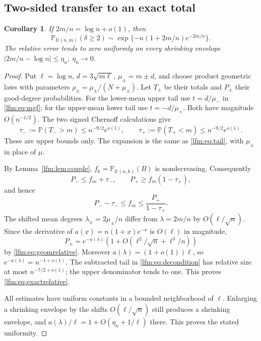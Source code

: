 \documentclass[11pt,letterpaper]{article}
\newtheorem{corollary}[theorem]{Corollary}
\theoremstyle{remark}\newtheorem{remark}[theorem]{Remark}
\newcommand{\Prob}{\mathbb P}\newcommand{\E}{\mathbb E}
\newcommand{\U}{\mathcal U}\newcommand{\dd}{\,\mathrm d}
\begin{document}
\subsection{Two-sided transfer to an exact total}
\begin{corollary}\label{lfm:cor:exactrelative}
If $2m/n=\log n+o(1)$, then
\begin{equation}
 \Prob_{\U(n,m)}(\delta\ge2)
 \sim\exp\{-n(1+2m/n)e^{-2m/n}\}.\label{lfm:eq:exactrelative}
\end{equation}
The relative error tends to zero uniformly on every shrinking envelope $|2m/n-\log n|\le\eta_n$, $\eta_n\to0$.
\end{corollary}
\begin{proof}
Put $\ell=\log n$, $d=3\sqrt{m\ell}$, $\mu_\pm=m\pm d$, and choose product geometric laws with parameters $\rho_\pm=\mu_\pm/(N+\mu_\pm)$. Let $T_\pm$ be their totals and $P_\pm$ their good-degree probabilities. For the lower-mean upper tail use $t=d/\mu_-$ in \eqref{lfm:eq:mgf}; for the upper-mean lower tail use $t=-d/\mu_+$. Both have magnitude $O(n^{-1/2})$. The two signed Chernoff calculations give
\begin{equation}
 \tau_-:=\Prob(T_->m)\le n^{-9/2}e^{o(1)},\qquad
 \tau_+:=\Prob(T_+<m)\le n^{-9/2}e^{o(1)}.\label{lfm:eq:both-tails}
\end{equation}
These are upper bounds only. The expansion is the same as \eqref{lfm:eq:tail}, with $\mu_\pm$ in place of $\mu$.

By Lemma~\ref{lfm:lem:couple}, $f_k=\Prob_{\U(n,k)}(B)$ is nondecreasing. Consequently
\[
 P_-\le f_m+\tau_-,\qquad
 P_+\ge f_m(1-\tau_+),
\]
and hence
\begin{equation}
 P_--\tau_-\le f_m\le\frac{P_+}{1-\tau_+}.\label{lfm:eq:decondition}
\end{equation}
The shifted mean degrees $\lambda_\pm=2\mu_\pm/n$ differ from $\lambda=2m/n$ by $O(\ell/\sqrt n)$. Since the derivative of $a(x)=n(1+x)e^{-x}$ is $O(\ell)$ in magnitude,
\[
 P_\pm=e^{-a(\lambda)}
 \left(1+O(\ell^2/\sqrt n+\ell^3/n)\right)
\]
by \eqref{lfm:eq:geomrelative}. Moreover $a(\lambda)=(1+o(1))\ell$, so $e^{-a(\lambda)}=n^{-1+o(1)}$. The subtracted tail in \eqref{lfm:eq:decondition} has relative size at most $n^{-7/2+o(1)}$; the upper denominator tends to one. This proves \eqref{lfm:eq:exactrelative}.

All estimates have uniform constants in a bounded neighborhood of $\ell$. Enlarging a shrinking envelope by the shifts $O(\ell/\sqrt n)$ still produces a shrinking envelope, and $a(\lambda)/\ell=1+O(\eta_n+1/\ell)$ there. This proves the stated uniformity.
\end{proof}
\end{document}
